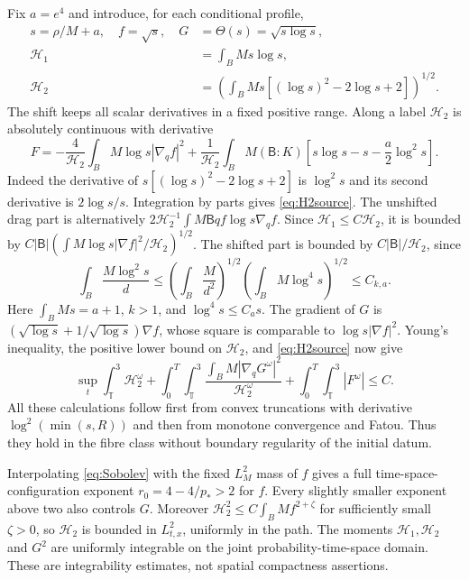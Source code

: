 \documentclass[11pt]{article}
\numberwithin{equation}{section}
\newcommand{\T}{\mathbb T^3}
\newcommand{\grad}{\nabla}
\newcommand{\Hone}{\mathcal H_1}
\newcommand{\Htwo}{\mathcal H_2}
\begin{document}
Fix $a=e^4$ and introduce, for each conditional profile,
\begin{equation}\label{eq:transforms}
\begin{aligned}
 s=\rho/M+a,\quad f=\sqrt s,\quad
 G&=\Theta(s)=\sqrt{s\log s},\\
 \Hone&=\int_BMs\log s,\\
 \Htwo&=\left(\int_BMs[(\log s)^2-2\log s+2]\right)^{1/2}.
\end{aligned}
\end{equation}
The shift keeps all scalar derivatives in a fixed positive range. Along a
label $\Htwo$ is absolutely continuous with derivative
\begin{equation}\label{eq:H2source}
 F=-\frac4{\Htwo}\int_BM\log s|\grad_qf|^2
 +\frac1{\Htwo}\int_BM(\mathsf B:K)
       \left[s\log s-s-\frac a2\log^2s\right].
\end{equation}
Indeed the derivative of $s[(\log s)^2-2\log s+2]$ is $\log^2s$ and its
second derivative is $2\log s/s$. Integration by parts gives
\eqref{eq:H2source}. The unshifted drag part is alternatively
$2\Htwo^{-1}\int M\mathsf Bqf\log s\grad_qf$. Since
$\Hone\leq C\Htwo$, it is bounded by
$C|\mathsf B|(\int M\log s|\grad f|^2/\Htwo)^{1/2}$.
The shifted part is bounded by $C|\mathsf B|/\Htwo$, since
\[
 \int_B\frac{M\log^2s}{d}\leq
 \left(\int_B\frac M{d^2}\right)^{1/2}
 \left(\int_BM\log^4s\right)^{1/2}\leq C_{k,a}.
\]
Here $\int_BMs=a+1$, $k>1$, and $\log^4s\leq C_as$.
The gradient of $G$ is
$(\sqrt{\log s}+1/\sqrt{\log s})\grad f$, whose square is comparable to
$\log s|\grad f|^2$. Young's inequality, the positive lower bound on
$\Htwo$, and \eqref{eq:H2source} now give
\begin{equation}\label{eq:logbounds}
 \sup_t\int_\T\Htwo^\omega+
 \int_0^T\int_\T\frac{\int_BM|\grad_qG^\omega|^2}{\Htwo^\omega}
 +\int_0^T\int_\T|F^\omega|\leq C.
\end{equation}
All these calculations follow first from convex truncations with derivative
$\log^2(\min(s,R))$ and then from monotone convergence and Fatou. Thus they
hold in the fibre class without boundary regularity of the initial datum.

Interpolating \eqref{eq:Sobolev} with the fixed $L^2_M$ mass of $f$ gives a
full time-space-configuration exponent $r_0=4-4/p_*>2$ for $f$.
Every slightly smaller exponent above two also controls $G$.
Moreover $\Htwo^2\leq C\int_BM f^{2+\zeta}$ for sufficiently small
$\zeta>0$, so $\Htwo$ is bounded in $L^2_{t,x}$, uniformly in the path.
The moments $\Hone,\Htwo$ and $G^2$ are uniformly integrable on the joint
probability-time-space domain. These are integrability estimates, not spatial
compactness assertions.
\end{document}

